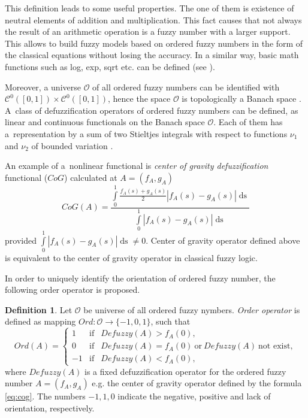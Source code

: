 \documentclass[review]{elsarticle}
\theoremstyle{definition}
\newtheorem{definition}{Definition}
\theoremstyle{theorem}
\DeclareMathOperator*{\ds}{ds}
\begin{document}
This definition leads to some useful properties. The one of them is existence of neutral elements of addition and multiplication. This fact causes that not always the result of an arithmetic operation is a fuzzy number with a larger support. This allows to build fuzzy models based on ordered fuzzy numbers in the form of the classical equations without losing the accuracy. In a similar way, basic math functions such as log, exp, sqrt etc. can be defined (see \cite{prokopowicz}).

Moreover, a universe $\mathcal{O}$ of all ordered fuzzy numbers can be identified with $\mathcal{C}^0([0,1])\times\mathcal{C}^0([0,1])$, hence the space $\mathcal{O}$ is topologically a Banach space \cite{kos2004}. A~class of defuzzification operators of ordered fuzzy numbers can be defined, as linear and continuous functionals on the Banach space $\mathcal{O}$. Each of them has a~representation by a sum of two Stieltjes integrals with respect to functions $\nu_1$ and $\nu_2$ of bounded variation \cite{kos2010,kos2013}.

An example of a~nonlinear functional is {\em center of gravity defuzzification} functional ($CoG$) calculated at $A=(f_A,g_A)$
\begin{equation}
\label{eq:cog}
CoG(A)=\frac{\int\limits_0^1\frac{f_A(s)+g_A(s)}{2}|f_A(s)-g_A(s)|\ds}{\int\limits_0^1|f_A(s)-g_A(s)|\ds}
\end{equation}
provided $\int\limits_0^1|f_A(s)-g_A(s)|\ds\neq0$. Center of gravity operator defined above is equivalent to the center of gravity operator in classical fuzzy logic.

In order to uniquely identify the orientation  of ordered fuzzy number, the following order operator is proposed.

\begin{definition}
Let $\mathcal{O}$ be universe of all ordered fuzzy nymbers. {\it Order operator} is defined as mapping $Ord\colon \mathcal{O}\to\{-1,0,1\}$, such that
\begin{equation}
\label{eq:os}
Ord(A)=\left\{
\begin{array}{cll}
1 & \text{if} & Defuzzy(A)>f_A(0),\\
0 & \text{if} & Defuzzy(A)=f_A(0)\ \text{or}\ Defuzzy(A)\ \text{not exist},\\
-1& \text{if} & Defuzzy(A)<f_A(0),
\end{array}
\right.
\end{equation}
where $Defuzzy(A)$ is a fixed defuzzification operator for the ordered fuzzy number $ A = (f_A, g_A) $ e.g. the center of gravity operator defined by the formula \eqref{eq:cog}. The numbers $ -1, 1, 0 $ indicate the negative, positive and lack of orientation, respectively.
\end{definition}
\end{document}
